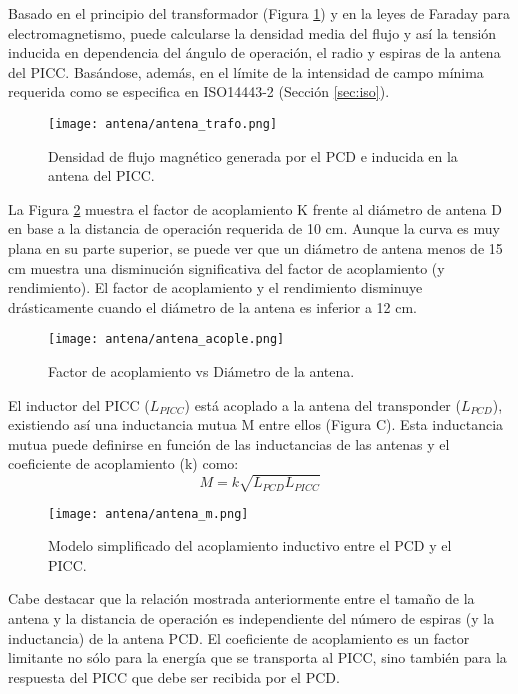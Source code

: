 Basado en el principio del transformador (Figura \ref{fig:trafo}) y en la leyes de Faraday para electromagnetismo, puede calcularse la densidad media del flujo y así la tensión inducida en dependencia del ángulo de operación, el radio y espiras de la antena del PICC. Basándose, además, en el límite de la intensidad de campo mínima requerida como se especifica en ISO14443-2 (Sección \ref{sec:iso}).

\begin{figure}[H]
\centering
\texttt{[image: antena/antena\_trafo.png]}
\caption{Densidad de flujo magnético generada por el PCD e inducida en la antena del PICC.}
\label{fig:trafo}
\end{figure}

La Figura \ref{fig:acople} muestra el factor de acoplamiento K frente al diámetro de antena D en base a la distancia de operación requerida de 10 cm.
Aunque la curva es muy plana en su parte superior, se puede ver que un diámetro de antena menos de 15 cm muestra una disminución significativa del factor de acoplamiento (y rendimiento). El factor de acoplamiento y el rendimiento disminuye drásticamente cuando el diámetro de la antena es inferior a 12 cm.

\begin{figure}[H]
\centering
\texttt{[image: antena/antena\_acople.png]}
\caption{Factor de acoplamiento vs Diámetro de la antena.}
\label{fig:acople}
\end{figure}

El inductor del PICC ($L_{PICC}$) está acoplado a la antena del transponder ($L_{PCD}$), existiendo así una inductancia mutua M entre ellos (Figura C). Esta inductancia mutua puede definirse en función de las inductancias de las antenas y el coeficiente de acoplamiento (k) como:
\begin{equation}
M = k \sqrt{L_{PCD}L_{PICC}}
\end{equation}

\begin{figure}[H]
\centering
\texttt{[image: antena/antena\_m.png]}
\caption{Modelo simplificado del acoplamiento inductivo entre el PCD y el PICC.}
\label{fig:acoplem}
\end{figure}

Cabe destacar que la relación mostrada anteriormente entre el tamaño de la antena y la distancia de operación es independiente del número de espiras (y la inductancia) de la antena PCD.
El coeficiente de acoplamiento es un factor limitante no sólo para la energía que se transporta al PICC, sino también para la respuesta del PICC que debe ser recibida por el PCD.


